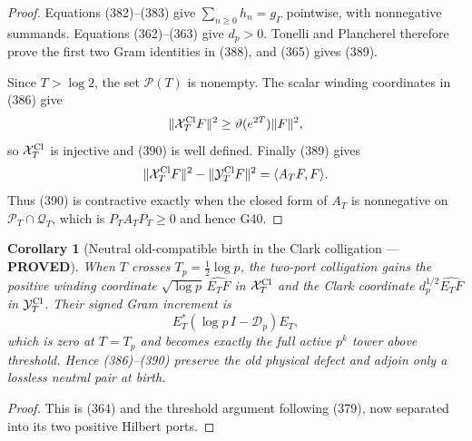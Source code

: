 \documentclass[11pt]{article}
\newtheorem{corollary}[theorem]{Corollary}
\newcommand{\PROVED}{\textcolor{green!45!black}{\textbf{PROVED}}}
\begin{document}
\begin{proof}
Equations (382)--(383) give
$\sum_{n\ge0}h_n=g_\Gamma$ pointwise, with nonnegative summands.
Equations (362)--(363) give $d_p>0$.  Tonelli and Plancherel therefore prove
the first two Gram identities in (388), and (365) gives (389).

Since $T>\log2$, the set $\mathcal P(T)$ is nonempty.  The scalar winding
coordinates in (386) give
\[
 \|\mathcal X_T^{\rm Cl}F\|^2
 \ge\vartheta(e^{2T})\|F\|^2,
\]
so $\mathcal X_T^{\rm Cl}$ is injective and (390) is well defined.
Finally (389) gives
\[
 \|\mathcal X_T^{\rm Cl}F\|^2
 -\|\mathcal Y_T^{\rm Cl}F\|^2
 =\langle A_TF,F\rangle.
\]
Thus (390) is contractive exactly when the closed form of $A_T$ is
nonnegative on $\mathcal P_T\cap\mathcal Q_T$, which is
$P_TA_TP_T\ge0$ and hence G40.
\end{proof}

\begin{corollary}[Neutral old-compatible birth in the Clark colligation ---
\PROVED]
When $T$ crosses $T_p=\frac12\log p$, the two-port colligation gains the
positive winding coordinate
$\sqrt{\log p}\,\widehat{E_TF}$ in $\mathcal X_T^{\rm Cl}$ and the Clark
coordinate $d_p^{1/2}\widehat{E_TF}$ in $\mathcal Y_T^{\rm Cl}$.  Their
signed Gram increment is
\begin{equation}
 E_T^*(\log p\,I-\mathcal D_p)E_T,                   \tag{392}
\end{equation}
which is zero at $T=T_p$ and becomes exactly the full active $p^k$ tower
above threshold.  Hence (386)--(390) preserve the old physical defect and
adjoin only a lossless neutral pair at birth.
\end{corollary}

\begin{proof}
This is (364) and the threshold argument following (379), now separated
into its two positive Hilbert ports.
\end{proof}
\end{document}
